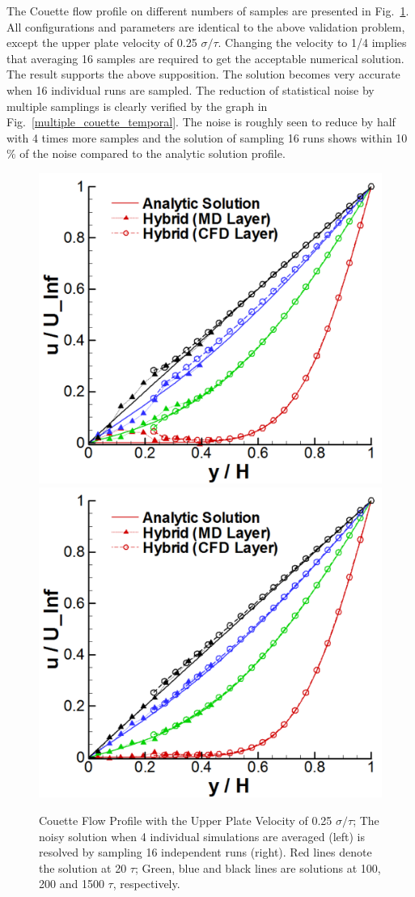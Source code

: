 \documentclass[preprint,12pt]{elsarticle}
\begin{document}
The Couette flow profile on different numbers of samples are presented in Fig.~\ref{multiple_couette}. All configurations and parameters are identical to the above validation problem, except the upper plate velocity of 0.25 $\sigma/\tau$. Changing the velocity to 1/4 implies that averaging 16 samples are required to get the acceptable numerical solution. The result supports the above supposition. The solution becomes very accurate when 16 individual runs are sampled. The reduction of statistical noise by multiple samplings is clearly verified by the graph in Fig.~\ref{multiple_couette_temporal}. The noise is roughly seen to reduce by half with 4 times more samples and the solution of sampling 16 runs shows within 10 $\%$ of the noise compared to the analytic solution profile.


\begin{figure}
\centering
\includegraphics[width=0.6\linewidth]{Couette_025_Samp4.pdf}
\hskip 1cm
\includegraphics[width=0.6\linewidth]{Couette_025_Samp16.pdf}
\vskip-0.2cm
\caption{\small Couette Flow Profile with the Upper Plate Velocity of 0.25 $\sigma/\tau$; The noisy solution when 4 individual simulations are averaged (left) is resolved by sampling 16 independent runs (right). Red lines denote the solution at 20 $\tau$; Green, blue and black lines are solutions at 100, 200 and 1500 $\tau$, respectively.}
\label{multiple_couette}
\end{figure}
\end{document}

